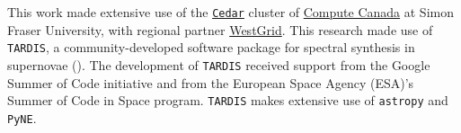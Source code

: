 \documentclass[twocolumn]{aastex63}
\begin{document}
This work made extensive use of the \href{https://docs.computecanada.ca/wiki/Cedar}{\texttt{Cedar}} cluster of \href{https://www.computecanada.ca/home/}{Compute Canada} at Simon Fraser University, with regional partner \href{https://www.westgrid.ca/}{WestGrid}. This research made use of \texttt{TARDIS}, a community-developed software package for spectral synthesis in supernovae (\citealt{kerzendorf14}). The development of \texttt{TARDIS} received support from the Google Summer of Code initiative and from the European Space Agency (ESA)'s Summer of Code in Space program. \texttt{TARDIS} makes extensive use of \texttt{astropy} and \texttt{PyNE}. 
\newline
\end{document}
